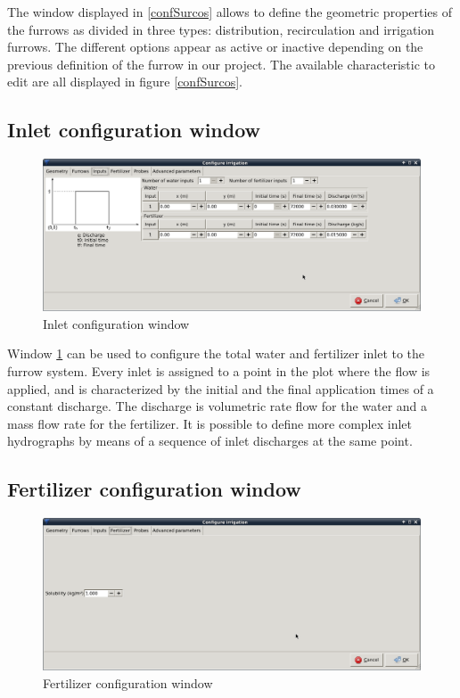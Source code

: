 The window displayed in \ref{confSurcos} allows to define the geometric properties of the furrows as divided in three types: distribution, recirculation and irrigation furrows. The different options appear as active or inactive depending on the previous definition of the furrow in our project. The available characteristic to edit are all displayed in figure \ref{confSurcos}.

\subsection{Inlet configuration window}

\begin{figure}[!h]
\begin{center}
\includegraphics*[width=\textwidth]{images/confInputEN.png}
\qquad
\caption{Inlet configuration window}\label{input}
\end{center}
\end{figure}

Window \ref{input} can be used to configure the total water and fertilizer inlet to the furrow system. Every inlet is assigned to a point in the plot where the flow is applied, and is characterized by the initial and the final application times of a constant discharge. The discharge is volumetric rate flow for the water and a mass flow rate for the fertilizer. It is possible to define more complex inlet hydrographs by means of a sequence of inlet discharges at the same point. 

\subsection{Fertilizer configuration window}

\begin{figure}[!h]
\begin{center}
\includegraphics*[width=\textwidth]{images/confFertiEN.png}
\qquad
\caption{Fertilizer configuration window}\label{ferti}
\end{center}
\end{figure}

